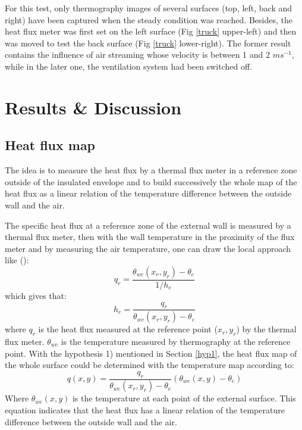 For this test, only thermography images of several surfaces (top, left, back and right) have been captured when the steady condition was reached. Besides, the heat flux meter was first set on the left surface (Fig \ref{truck} upper-left) and then was moved to test the back surface (Fig \ref{truck} lower-right). The former result contains the influence of air streaming whose velocity is between 1 and 2 $ms^{-1}$, while in the later one, the ventilation system had been switched off.

\section{Results \& Discussion}
\subsection{Heat flux map}
The idea is to measure the heat flux by a thermal flux meter in a reference zone outside of the insulated envelope and to build successively the whole map of the heat flux as a linear relation of the temperature difference between the outside wall and the air.

The specific heat flux at a reference zone of the external wall is measured by a thermal flux meter, then with the wall temperature in the proximity of the flux meter and by measuring the air temperature, one can draw the local approach like (\citep{rossi2009k}):
\begin{equation}
q_r = \frac{\theta_{we}(x_r,y_r)-\theta_e}{1/h_e}
\end{equation}
which gives that:
\begin{equation}
h_e = \frac{q_r}{\theta_{we}(x_r,y_r)-\theta_e}
\end{equation}
where $q_r$ is the heat flux measured at the reference point ($x_r,y_r$) by the thermal flux meter. $\theta_{we}$ is the temperature measured by thermography at the reference point. With the hypothesis 1) mentioned in Section \ref{hyp1}, the heat flux map of the whole surface could be determined with the temperature map according to:
\begin{equation}
q(x,y) = \frac{q_r}{\theta_{we}(x_r,y_r)-\theta_e}(\theta_{we}(x,y)-\theta_e)
\label{eq_q}
\end{equation}
Where $\theta_{we}(x,y)$ is the temperature at each point of the external surface. This equation indicates that the  heat flux has a linear relation of the temperature difference between the outside wall and the air.

